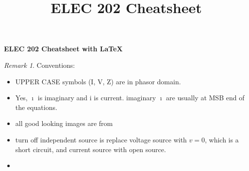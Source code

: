 \documentclass[10pt,landscape]{article}
\title{ELEC 202 Cheatsheet}
\theoremstyle{definition}
\theoremstyle{remark}
\newtheorem*{remark}{Remark}
\begin{document}
\raggedright
\footnotesize

\begin{center}
     \Large{\textbf{ ELEC 202 Cheatsheet with \LaTeX}} \\
\end{center}

\begin{multicols}{3}
\setlength{\premulticols}{1pt}
\setlength{\postmulticols}{1pt}
\setlength{\multicolsep}{1pt}
\setlength{\columnsep}{2pt}




\begin{remark}
Conventions: \\
\begin{itemize}[noitemsep,nolistsep]
    \item UPPER CASE symbols (I, V, Z) are in phasor domain. 
    \item Yes, $\imath$ is imaginary and i is current. imaginary $\imath$ are usually at MSB end of the equations. 
    \item all good looking images are from \cite{Alexander:2006:FEC:1207036}
    \item turn off independent source is replace voltage source with $v = 0$, which is a short circuit, and current source with open source. 
    \item
\end{itemize}
\end{remark}





\end{multicols}
\end{document}
